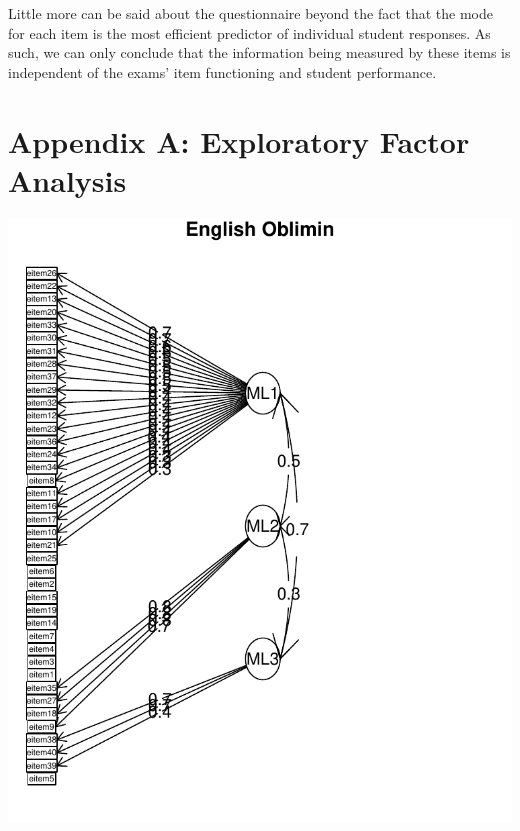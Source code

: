 \documentclass{article}\usepackage[]{graphicx}\usepackage[]{color}
\makeatletter
\def\maxwidth{ %
  \ifdim\Gin@nat@width>\linewidth
    \linewidth
  \else
    \Gin@nat@width
  \fi
}
\newenvironment{knitrout}{}{} %
\makeatother
\begin{document}
Little more can be said about the questionnaire beyond the fact that the mode for each item is the most efficient predictor of individual student responses. As such, we can only conclude that the information being measured by these items is independent of the exams' item functioning and student performance.


{}



\section{Appendix A: Exploratory Factor Analysis}

\begin{knitrout}
\color{fgcolor}
\includegraphics[width=\maxwidth]{figure/unnamed-chunk-141} 


\end{knitrout}
\end{document}
